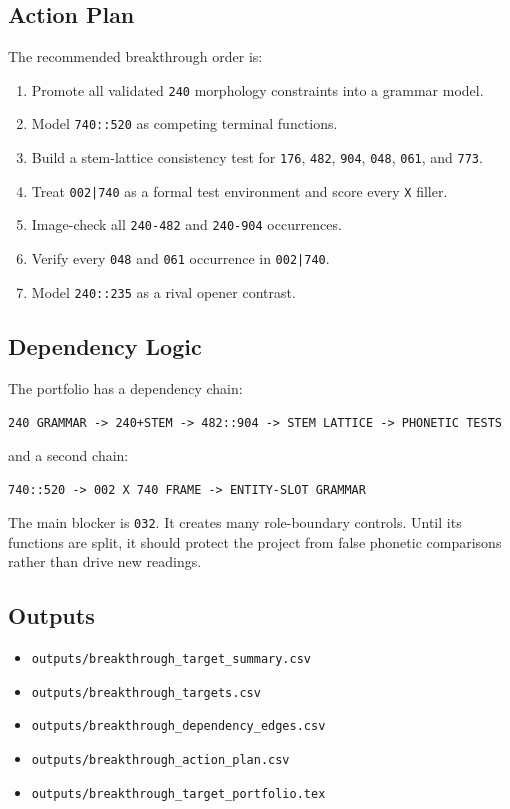 \subsection{Action Plan}

The recommended breakthrough order is:

\begin{enumerate}
  \item Promote all validated \texttt{240} morphology constraints into a grammar model.
  \item Model \texttt{740::520} as competing terminal functions.
  \item Build a stem-lattice consistency test for \texttt{176}, \texttt{482}, \texttt{904}, \texttt{048}, \texttt{061}, and \texttt{773}.
  \item Treat \texttt{002|740} as a formal test environment and score every \texttt{X} filler.
  \item Image-check all \texttt{240-482} and \texttt{240-904} occurrences.
  \item Verify every \texttt{048} and \texttt{061} occurrence in \texttt{002|740}.
  \item Model \texttt{240::235} as a rival opener contrast.
\end{enumerate}

\subsection{Dependency Logic}

The portfolio has a dependency chain:

\begin{center}
\texttt{240 GRAMMAR -> 240+STEM -> 482::904 -> STEM LATTICE -> PHONETIC TESTS}
\end{center}

and a second chain:

\begin{center}
\texttt{740::520 -> 002 X 740 FRAME -> ENTITY-SLOT GRAMMAR}
\end{center}

The main blocker is \texttt{032}. It creates many role-boundary controls. Until its functions are split, it should protect the project from false phonetic comparisons rather than drive new readings.

\subsection{Outputs}

\begin{itemize}
  \item \texttt{outputs/breakthrough\_target\_summary.csv}
  \item \texttt{outputs/breakthrough\_targets.csv}
  \item \texttt{outputs/breakthrough\_dependency\_edges.csv}
  \item \texttt{outputs/breakthrough\_action\_plan.csv}
  \item \texttt{outputs/breakthrough\_target\_portfolio.tex}
\end{itemize}
